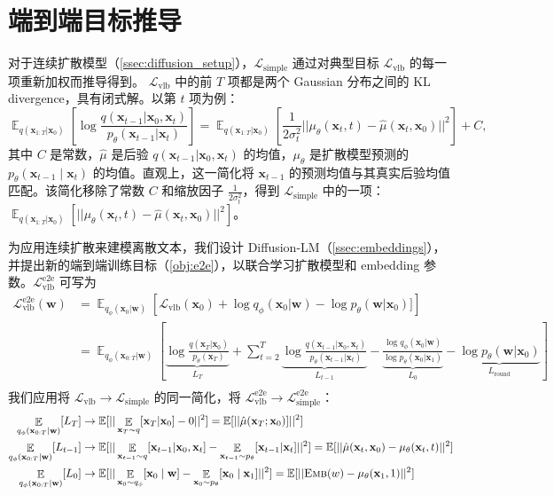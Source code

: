 \documentclass{article}
\newcommand{\exper}[1]{\textsc{#1}}
\newcommand{\expmb}[1]{\mathbf{#1}}
\newcommand{\expobj}[1]{\mathcal{L}_\text{#1}}
\newcommand{\ww}{\expmb{w}}
\newcommand{\cx}[1]{\mathbf{x}_{#1}}
\newcommand{\ptheta}{p_\theta}
\newcommand{\qphi}{q_\phi}
\newcommand{\Lsimple}{\expobj{simple}}
\newcommand{\Lvlb}{\expobj{vlb}}
\newcommand{\Lsimpleee}{\mathcal{L}^\text{e2e}_\text{simple}}
\newcommand{\Emb}{\exper{Emb}}
\begin{document}
\section{端到端目标推导}
\label{app:derive}
对于连续扩散模型（\cref{ssec:diffusion_setup}），$\Lsimple$ 通过对典型目标 $\Lvlb$ 的每一项重新加权而推导得到。
$\Lvlb$ 中的前 $T$ 项都是两个 Gaussian 分布之间的 KL divergence，具有闭式解。以第 $t$ 项为例：
\begin{equation}
\mathop{\mathbb{E}}_{q(\cx{1:T} | \cx{0})} \left[ \log \frac{q(\cx{t-1} | \cx{0},\cx{t})} {\ptheta(\cx{t-1} | \cx{t}) }\right] = \mathop{\mathbb{E}}_{ q(\cx{1:T} | \cx{0})}  \left[ \frac{1}{2\sigma_t^2}  || \mu_\theta(\cx{t}, t) - \hat{\mu}(\cx{t}, \cx{0}) ||^2\right] + C, 
\label{app:eqn:simple}
\end{equation}
其中 $C$ 是常数，$\hat{\mu}$ 是后验 $q(\cx{t-1} | \cx{0},\cx{t})$ 的均值，$\mu_\theta$ 是扩散模型预测的 $\ptheta(\cx{t-1} \mid \cx{t})$ 的均值。直观上，这一简化将 $\cx{t-1}$ 的预测均值与其真实后验均值匹配。该简化移除了常数 $C$ 和缩放因子 $\frac{1}{2\sigma_t^2}$，得到 $\Lsimple$ 中的一项：$\mathop{\mathbb{E}}_{ q(\cx{1:T} | \cx{0})}  \left[  || \mu_\theta(\cx{t}, t) - \hat{\mu}(\cx{t}, \cx{0}) ||^2\right]$。

为应用连续扩散来建模离散文本，我们设计 Diffusion-LM（\cref{ssec:embeddings}），并提出新的端到端训练目标（\cref{obj:e2e}），以联合学习扩散模型和 embedding 参数。$\Lvlb^{\text{e2e}}$ 可写为
\begin{align*}
    \mathcal{L}^\text{e2e}_{\text{vlb}} (\ww) &= \mathop{\mathbb{E}}_{q_\phi(\cx{0} | \ww)}\left[\mathcal{L}_{\text{vlb}} (\cx{0}) + \log \qphi(\cx{0} | \ww) - \log \ptheta(\ww | \cx{0})]\right] \\
    &= \mathop{\mathbb{E}}_{q_\phi(\cx{0:T} | \ww)}  \left[\underbrace{\log \frac{q(\cx{T} | \cx{0})}{\ptheta(\cx{T})}}_{L_T} + \sum_{t=2}^T \underbrace{\log \frac{q(\cx{t-1} | \cx{0},\cx{t})} {\ptheta(\cx{t-1} | \cx{t}) }}_{L_{t-1}} - \underbrace{\frac{\log \qphi(\cx{0} | \ww)}{\log \ptheta( \cx{0} | \cx{1})}}_{L_{0}}     - \underbrace{\log \ptheta(\ww | \cx{0})}_{L_\text{round}}\right]  \\
\end{align*}
我们应用将 $\Lvlb \rightarrow \Lsimple$ 的同一简化，将 $\mathcal{L}^\text{e2e}_{\text{vlb}} \rightarrow \Lsimpleee$：
\begin{align*}
    \mathop{\mathbb{E}}_{q_\phi(\cx{0:T} | \ww)} [L_T] & \rightarrow \mathbb{E}[||\mathop{\mathbb{E}}_{\cx{T}\sim q}[\cx{T}| \cx{0}] - 0 ||^2] = \mathbb{E}[||\hat{\mu}(\cx{T}; \cx{0})] ||^2] \\
    \mathop{\mathbb{E}}_{q_\phi(\cx{0:T} | \ww)} [L_{t-1}] & \rightarrow \mathbb{E}[|| \mathop{\mathbb{E}}_{\cx{t-1}\sim q}[\cx{t-1}| \cx{0}, \cx{t}] - \mathop{\mathbb{E}}_{\cx{t-1} \sim \ptheta}  [\cx{t-1} | \cx{t}] ||^2] =\mathbb{E}[ ||\hat{\mu}(\cx{t}, \cx{0})-\mu_\theta(\cx{t}, t) ||^2]\\
    \mathop{\mathbb{E}}_{q_\phi(\cx{0:T} | \ww)} [L_{0}] & \rightarrow \mathbb{E}[|| \mathop{\mathbb{E}}_{\cx{0}\sim\qphi} [\cx{0} \mid \ww] - \mathop{\mathbb{E}}_{\cx{0} \sim \ptheta} [\cx{0}  \mid \cx{1} ] ||^2] = \mathbb{E}[ ||\Emb(w)-\mu_\theta(\cx{1}, 1) ||^2]
\end{align*}
\end{document}
